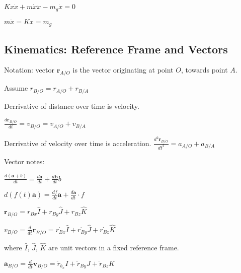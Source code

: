$Kx\dot{x} + m\dot{x}\ddot{x} - m_g\dot{x} = 0$

$m\ddot{x} =  Kx = m_g$

\subsection{Kinematics: Reference Frame and Vectors}

Notation: vector $\mathbf r_{A/O}$ is the vector originating at point $O$,
towards point $A$.


Assume $r_{B/O} = r_{A/O} + r_{B/A}$

Derrivative of distance over time is velocity.

$\frac{d\mathbf r_{B/O}}{dt} = v_{B/O} = v_{A/O} + v_{B/A}$

Derrivative of velocity over time is acceleration.
$\frac{d^2 \mathbf r_{B/O}}{dt^2} = a_{A/O} + a_{B/A}$

Vector notes:

$\frac{d(\mathbf a + b)}{dt} = \frac{d\mathbf a}{dt} + \frac{d \mathbf b}{dt}b$

$d(f(t)\mathbf a) = \frac{df}{dt}\mathbf  a + \frac{d\mathbf a}{dt}\cdot f$

$\mathbf r_{B/O} = r_{Bx}\hat I + r_{By}\hat J + r_{Bz}\hat K$

$v_{B/O} = \frac{d}{dt}\mathbf r_{B/O} = \dot{r_{Bx}}\hat I +  \dot{r_{By}}\hat J +  \dot{r_{Bz}}\hat K$

where $\hat I$, $\hat J$, $\hat K$ are unit vectors in a fixed reference frame.

$\mathbf a_{B/O} = \frac{d}{dt} \mathbf v_{B/O} = \ddot{r}_{b_x} I + \ddot{r}_{By} J + \ddot{r}_{Bz} K$
